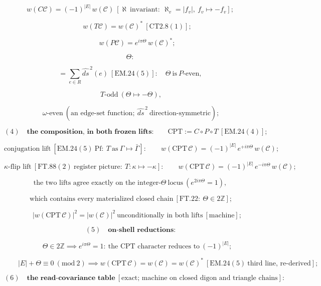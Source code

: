 \begin{theorem}
\[
w(C\mathcal C)=(-1)^{|E|}\,w(\mathcal C)\ [\aleph\ \text{invariant}:\ \aleph_v=|f_v|,\ f_v\mapsto-f_v];
\]

\[
\qquad w(T\mathcal C)=w(\mathcal C)^{*}\ [\mathrm{CT2.8}(1)];
\]

\[
\qquad w(P\mathcal C)=e^{i\pi\Theta}\,w(\mathcal C)^{*};
\]

\[
\Theta:
\]

\[
= \!\!\sum_{e\in R}\!\!\widehat{ds}^{\,2}(e)\ [\mathrm{EM.24}(5)]:\quad\Theta\ \text{is}\ P\text{-even},
\]

\[
\ T\text{-odd}\ (\Theta\mapsto-\Theta),
\]

\[
\ \omega\text{-even}\ (\text{an edge-set function};\ \widehat{ds}^{\,2}\ \text{direction-symmetric});
\]

\[
(4)\quad\textbf{the composition, in both frozen lifts:}\qquad\mathrm{CPT}:=C\circ P\circ T\ [\mathrm{EM.24}(4)];
\]

\[
\text{conjugation lift}\ [\mathrm{EM.24}(5)\ \mathrm{Pf}:\ T\ \text{as}\ \Gamma\mapsto\bar\Gamma]:\qquad w(\mathrm{CPT}\,\mathcal C)=(-1)^{|E|}\,e^{+i\pi\Theta}\,w(\mathcal C);
\]

\[
\kappa\text{-flip lift}\ [\mathrm{FT.88}(2)\ \text{register picture}:\ T:\kappa\mapsto-\kappa]:\qquad w(\mathrm{CPT}\,\mathcal C)=(-1)^{|E|}\,e^{-i\pi\Theta}\,w(\mathcal C);
\]

\[
\text{the two lifts agree exactly on the integer-}\Theta\ \text{locus}\ (e^{2i\pi\Theta}=1),
\]

\[
\ \text{which contains every materialized closed chain}\ [\mathrm{FT.22}:\ \Theta\in2\mathbb Z];
\]

\[
\qquad \bigl|w(\mathrm{CPT}\,\mathcal C)\bigr|^2=\bigl|w(\mathcal C)\bigr|^2\ \text{unconditionally in both lifts}\ [\text{machine}];
\]

\[
(5)\quad\textbf{on-shell reductions:}
\]

\[
\qquad \Theta\in2\mathbb Z\implies e^{i\pi\Theta}=1:\ \text{the CPT character reduces to}\ (-1)^{|E|};
\]

\[
\qquad |E|+\Theta\equiv0\ (\mathrm{mod}\ 2)\implies w(\mathrm{CPT}\,\mathcal C)=w(\mathcal C)=w(\mathcal C)^{*}\ [\mathrm{EM.24}(5)\ \text{third line, re-derived}];
\]

\[
(6)\quad\textbf{the read-covariance table}\ [\text{exact; machine on closed digon and triangle chains}]:
\]


\end{theorem}
